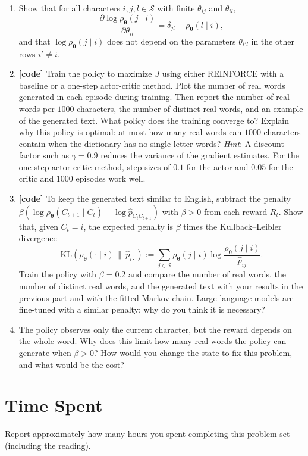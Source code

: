 \documentclass[letterpaper]{article}
\begin{document}
\begin{enumerate}
\item Show that for all characters $i, j, l \in \mathcal{S}$ with finite $\theta_{ij}$ and $\theta_{il}$,
  \[
    \frac{\partial \log \rho_{\bm{\theta}}(j \mid i)}{\partial \theta_{il}} = \delta_{jl} - \rho_{\bm{\theta}}(l \mid i),
  \]
  and that $\log \rho_{\bm{\theta}}(j \mid i)$ does not depend on the parameters $\theta_{i'l}$ in the other rows $i' \neq i$.
\item \textbf{[code]} Train the policy to maximize $J$ using either REINFORCE with a baseline or a one-step actor-critic method. Plot the number of real words generated in each episode during training. Then report the number of real words per $1000$ characters, the number of distinct real words, and an example of the generated text. What policy does the training converge to? Explain why this policy is optimal: at most how many real words can $1000$ characters contain when the dictionary has no single-letter words? \emph{Hint}: A discount factor such as $\gamma = 0.9$ reduces the variance of the gradient estimates. For the one-step actor-critic method, step sizes of $0.1$ for the actor and $0.05$ for the critic and $1000$ episodes work well.
\item \textbf{[code]} To keep the generated text similar to English, subtract the penalty $\beta \left(\log \rho_{\bm{\theta}}(C_{t+1} \mid C_t) - \log \hat{p}_{C_t C_{t+1}}\right)$ with $\beta > 0$ from each reward $R_t$. Show that, given $C_t = i$, the expected penalty is $\beta$ times the Kullback--Leibler divergence
  \[
    \mathrm{KL}\left(\rho_{\bm{\theta}}(\cdot \mid i) \,\|\, \hat{p}_{i \cdot}\right) := \sum_{j \in \mathcal{S}} \rho_{\bm{\theta}}(j \mid i) \log \frac{\rho_{\bm{\theta}}(j \mid i)}{\hat{p}_{ij}}.
  \]
  Train the policy with $\beta = 0.2$ and compare the number of real words, the number of distinct real words, and the generated text with your results in the previous part and with the fitted Markov chain. Large language models are fine-tuned with a similar penalty; why do you think it is necessary?
\item The policy observes only the current character, but the reward depends on the whole word. Why does this limit how many real words the policy can generate when $\beta > 0$? How would you change the state to fix this problem, and what would be the cost?
\end{enumerate}

\section{Time Spent}

Report approximately how many hours you spent completing this problem set (including the reading).
\end{document}
